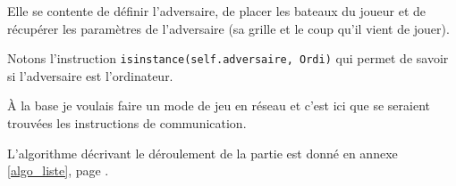 Elle se contente de définir l'adversaire, de placer les bateaux du joueur et de récupérer les paramètres de l'adversaire (sa grille et le coup qu'il vient de jouer).

Notons l'instruction \texttt{isinstance(self.adversaire, Ordi)} qui permet de savoir si l'adversaire est l'ordinateur.

\medskip

À la base je voulais faire un mode de jeu en réseau et c'est ici que se seraient trouvées les instructions de communication.

\medskip

L'algorithme décrivant le déroulement de la partie est donné en annexe \ref{algo_liste}, page \pageref{algo_partie}.

%
